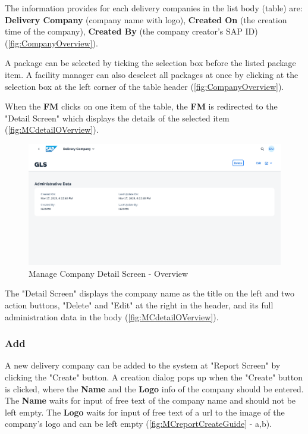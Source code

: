 The information provides for each delivery companies in the list body (table) are: \textbf{Delivery Company} (company name with logo), \textbf{Created On} (the creation time of the company), \textbf{Created By} (the company creator's SAP ID) (\autoref{fig:CompanyOverview}). 

A package can be selected by ticking the selection box before the listed package item. A facility manager can also deselect all packages at once by clicking at the selection box at the left corner of the table header (\autoref{fig:CompanyOverview}). 

\bigskip

When the \textbf{FM} clicks on one item of the table, the \textbf{FM} is redirected to the "Detail Screen" which displays the details of the selected item (\autoref{fig:MCdetailOVerview}). 

\begin{figure}[H]
	\centering
	\includegraphics[width=1\linewidth]{images/user_doc/company/detail/DetailOverview.png}
	\caption{Manage Company Detail Screen - Overview}
	\label{fig:MCdetailOVerview}
\end{figure}

The "Detail Screen" displays the company name as the title on the left and two action buttons, "Delete" and "Edit" at the right in the header, and its full administration data in the body (\autoref{fig:MCdetailOVerview}). 

\subsubsection{Add}

A new delivery company can be added to the system at "Report Screen" by clicking the "Create" button. 
A creation dialog pops up when the "Create" button is clicked, where the \textbf{Name} and the \textbf{Logo} info of the company should be entered. The \textbf{Name} waits for input of free text of the company name and should not be left empty. The \textbf{Logo} waits for input of free text of a url to the image of the company's logo and can be left empty (\autoref{fig:MCreportCreateGuide} - a,b). 

